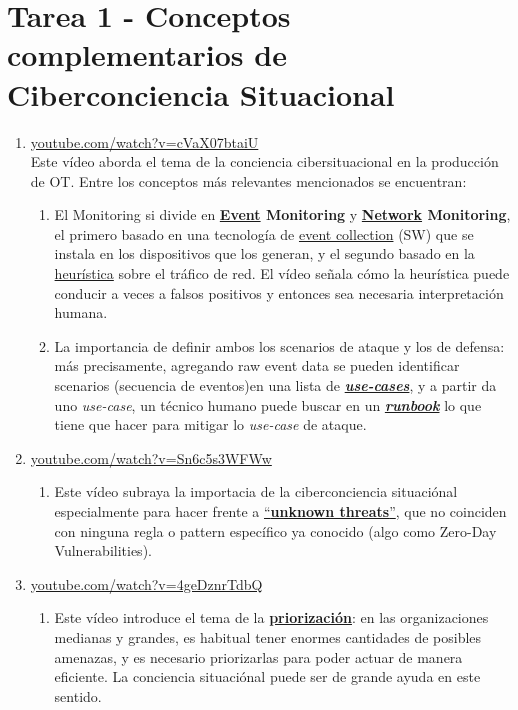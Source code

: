 \chapter*{Tarea 1 - Conceptos complementarios de Ciberconciencia Situacional}

\begin{enumerate}
   \item 
   \href{https://www.youtube.com/watch?v=cVaX07btaiU}{youtube.com/watch?v=cVaX07btaiU}\\
   Este vídeo aborda el tema de la conciencia cibersituacional en la producción de OT.
   Entre los conceptos más relevantes mencionados se encuentran:
   \begin{enumerate}
      \item El Monitoring si divide en \textbf{\ul{Event} Monitoring} y \textbf{\ul{Network} Monitoring}, el primero basado en una tecnología de \ul{event collection} (SW) que se instala en los dispositivos que los generan, y el segundo basado en la \ul{heurística} sobre el tráfico de red. El vídeo señala cómo la heurística puede conducir a veces a falsos positivos y entonces sea necesaria interpretación humana.
      \item La importancia de definir ambos los scenarios de ataque y los de defensa: más precisamente, agregando raw event data se pueden identificar scenarios (secuencia de eventos)en una lista de \textit{\textbf{\ul{use-cases}}}, y a partir da uno \textit{use-case}, un técnico humano puede buscar en un \textit{\textbf{\ul{runbook}}} lo que tiene que hacer para mitigar lo \textit{use-case} de ataque.  
   \end{enumerate}
   \item \href{https://www.youtube.com/watch?v=Sn6c5s3WFWw}{youtube.com/watch?v=Sn6c5s3WFWw}
   \begin{enumerate}
      \item Este vídeo subraya la importacia de la ciberconciencia situaciónal  especialmente para hacer frente a \ul{``\textbf{unknown threats}''}, que no coinciden con ninguna regla o pattern específico ya conocido (algo como Zero-Day Vulnerabilities).
   \end{enumerate}
   \item \href{https://www.youtube.com/watch?v=4geDznrTdbQ}{youtube.com/watch?v=4geDznrTdbQ}
   \begin{enumerate}
      \item Este vídeo introduce el tema de la \textbf{\ul{priorización}}: en las organizaciones medianas y grandes, es habitual tener enormes cantidades de posibles amenazas, y es necesario priorizarlas para poder actuar de manera eficiente. La conciencia situaciónal puede ser de grande ayuda en este sentido.

\end{enumerate}
\end{enumerate}
